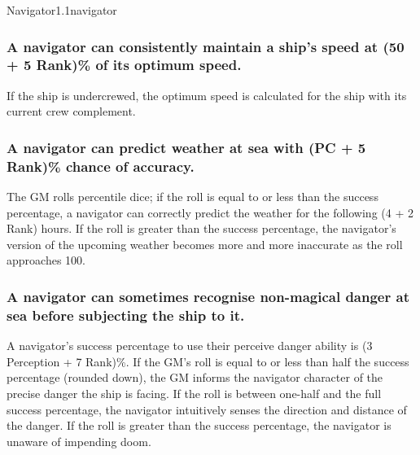 \begin{skill}{Navigator}{1.1}{navigator}
\subsubsection{A navigator can consistently maintain a ship's
speed at (50 + 5 \x Rank)\% of its optimum speed.}

If the ship is undercrewed, the optimum speed is calculated for the
ship with its current crew complement.

\subsubsection{A navigator can predict weather at sea with (PC + 5 \x
Rank)\% chance of accuracy.}

The GM rolls percentile dice; if the roll is equal to or less than the
success percentage, a navigator can correctly predict the weather for
the following (4 + 2 \x Rank) hours.  If the roll is greater than the
success percentage, the navigator's version of the upcoming weather
becomes more and more inaccurate as the roll approaches 100.

\subsubsection{A navigator can sometimes recognise non-magical danger
at sea before subjecting the ship to it.}

A navigator's success percentage to use their perceive danger ability
is (3 \x Perception + 7 \x Rank)\%.  If the GM's roll is equal to or
less than half the success percentage (rounded down), the GM informs
the navigator character of the precise danger the ship is facing.  If
the roll is between one-half and the full success percentage, the
navigator intuitively senses the direction and distance of the danger.
If the roll is greater than the success percentage, the navigator is
unaware of impending doom.

\end{skill}
